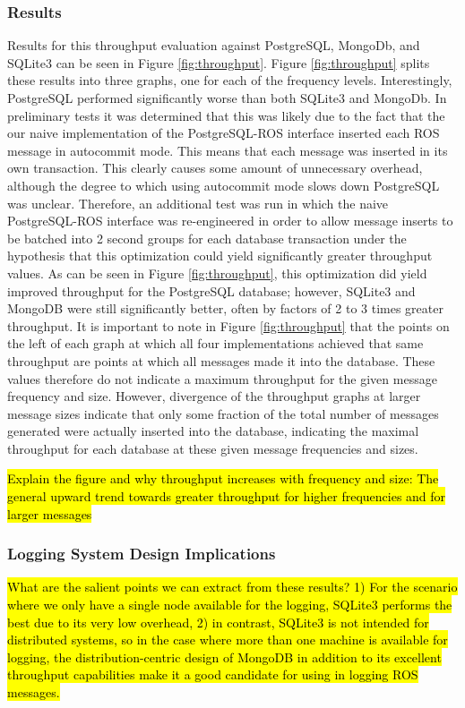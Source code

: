 \documentclass[nocopyrightspace]{acm_proc_article-sp}
\begin{document}
\subsubsection{Results}
Results for this throughput evaluation against PostgreSQL, MongoDb, and SQLite3 can be seen in Figure \ref{fig:throughput}. Figure \ref{fig:throughput} splits these results into three graphs, one for each of the frequency levels. Interestingly, PostgreSQL performed significantly worse than both SQLite3 and MongoDb. In preliminary tests it was determined that this was likely due to the fact that the our naive implementation of the PostgreSQL-ROS interface inserted each ROS message in autocommit mode. This means that each message was inserted in its own transaction. This clearly causes some amount of unnecessary overhead, although the degree to which using autocommit mode slows down PostgreSQL was unclear. Therefore, an additional test was run in which the naive PostgreSQL-ROS interface was re-engineered in order to allow message inserts to be batched into 2 second groups for each database transaction under the hypothesis that this optimization could yield significantly greater throughput values. As can be seen in Figure \ref{fig:throughput}, this optimization did yield improved throughput for the PostgreSQL database; however, SQLite3 and MongoDB were still significantly better, often by factors of 2 to 3 times greater throughput. It is important to note in Figure \ref{fig:throughput} that the points on the left of each graph at which all four implementations achieved that same throughput are points at which all messages made it into the database. These values therefore do not indicate a maximum throughput for the given message frequency and size. However, divergence of the throughput graphs at larger message sizes indicate that only some fraction of the total number of messages generated were actually inserted into the database, indicating the maximal throughput for each database at these given message frequencies and sizes. 

\hl{Explain the figure and why throughput increases with frequency and size: The general upward trend towards greater throughput for higher frequencies and for larger messages}

\subsubsection{Logging System Design Implications}

\hl{What are the salient points we can extract from these results? 1) For the scenario where we only have a single node available for the logging, SQLite3 performs the best due to its very low overhead, 2) in contrast, SQLite3 is not intended for distributed systems, so in the case where more than one machine is available for logging, the distribution-centric design of MongoDB in addition to its excellent throughput capabilities make it a good candidate for using in logging ROS messages.}
\end{document}
